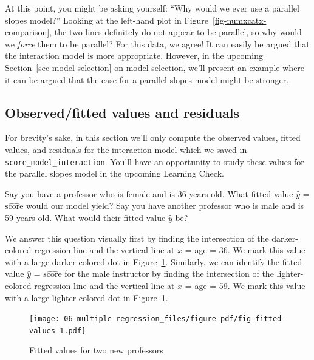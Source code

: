 \documentclass[
  letterpaper,
  DIV=11,
  numbers=noendperiod]{scrreprt}
\theoremstyle{definition}
\theoremstyle{remark}
\begin{document}
At this point, you might be asking yourself: ``Why would we ever use a
parallel slopes model?'' Looking at the left-hand plot in
Figure~\ref{fig-numxcatx-comparison}, the two lines definitely do not
appear to be parallel, so why would we \emph{force} them to be parallel?
For this data, we agree! It can easily be argued that the interaction
model is more appropriate. However, in the upcoming
Section~\ref{sec-model-selection} on model selection, we'll present an
example where it can be argued that the case for a parallel slopes model
might be stronger.

\hypertarget{sec-model4points}{%
\subsection{Observed/fitted values and
residuals}\label{sec-model4points}}

For brevity's sake, in this section we'll only compute the observed
values, fitted values, and residuals for the interaction model which we
saved in \texttt{score\_model\_interaction}. You'll have an opportunity
to study these values for the parallel slopes model in the upcoming
Learning Check.

Say you have a professor who is female and is 36 years old. What fitted
value \(\widehat{y}\) = \(\widehat{\text{score}}\) would our model
yield? Say you have another professor who is male and is 59 years old.
What would their fitted value \(\widehat{y}\) be?

We answer this question visually first by finding the intersection of
the darker-colored regression line and the vertical line at \(x\) = age
= 36. We mark this value with a large darker-colored dot in
Figure~\ref{fig-fitted-values}. Similarly, we can identify the fitted
value \(\widehat{y}\) = \(\widehat{\text{score}}\) for the male
instructor by finding the intersection of the lighter-colored regression
line and the vertical line at \(x\) = age = 59. We mark this value with
a large lighter-colored dot in Figure~\ref{fig-fitted-values}.

\begin{figure}

{\centering \texttt{[image: 06-multiple-regression\_files/figure-pdf/fig-fitted-values-1.pdf]}

}

\caption{\label{fig-fitted-values}Fitted values for two new professors}

\end{figure}
\end{document}
